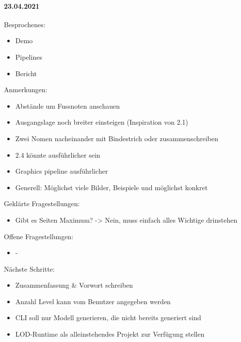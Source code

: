 \newpage

\paragraph{23.04.2021}
Besprochenes:
\begin{itemize}
  \item Demo
  \item Pipelines
  \item Bericht
\end{itemize}
Anmerkungen:
\begin{itemize}
  \item Abstände um Fussnoten anschauen
  \item Ausgangslage noch breiter einsteigen (Inspiration von 2.1)
  \item Zwei Nomen nacheinander mit Bindestrich oder zusammenschreiben
  \item 2.4 könnte ausführlicher sein
  \item Graphics pipeline ausführlicher
  \item Generell: Möglichst viele Bilder, Beispiele und möglichst konkret
\end{itemize}
Geklärte Fragestellungen:
\begin{itemize}
  \item Gibt es Seiten Maximum? -> Nein, muss einfach alles Wichtige drinstehen
\end{itemize}
Offene Fragestellungen:
\begin{itemize}
  \item -
\end{itemize}
Nächste Schritte:
\begin{itemize}
  \item Zusammenfassung \& Vorwort schreiben
  \item Anzahl Level kann vom Benutzer angegeben werden
  \item CLI soll nur Modell generieren, die nicht bereits generiert sind
  \item LOD-Runtime als alleinstehendes Projekt zur Verfügung stellen
\end{itemize}

\newpage

